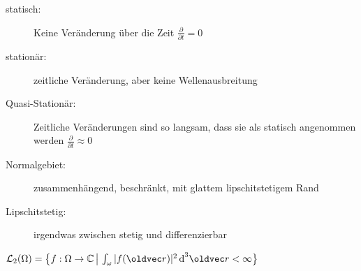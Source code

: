 \documentclass[6pt,a4paper]{scrartcl}
\let\vec\oldvec
\begin{document}
\begin{multicols}{4}
	\begin{description}
		\item[statisch:] Keine Veränderung über die Zeit $\frac{\partial}{\partial t} = 0$
		\item[stationär:] zeitliche Veränderung, aber keine Wellenausbreitung
		\item[Quasi-Stationär:] Zeitliche Veränderungen sind so langsam, dass sie als statisch angenommen werden $\frac{\partial}{\partial t} \approx 0$
		\item[Normalgebiet:] zusammenhängend, beschränkt, mit glattem lipschitstetigem Rand
		\item[Lipschitstetig:] irgendwas zwischen stetig und differenzierbar
	\end{description}
	$\mathcal L_2(\Omega) = \iset{f:\Omega \ra \C}{\int_\omega |f(\vec r)|^2 \diff^3 \vec r < \infty }$\\
	
	
	








\end{multicols}

\end{document}
